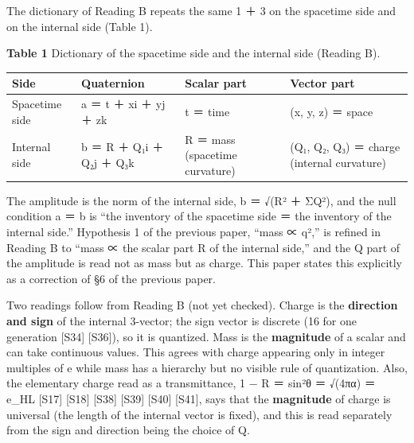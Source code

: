 \documentclass[
  a4paper,
]{article}
\newcounter{none} %
\begin{document}
The dictionary of Reading B repeats the same 1 ＋ 3 on the spacetime
side and on the internal side (Table 1).

\textbf{Table 1} Dictionary of the spacetime side and the internal side
(Reading B).

{\def\LTcaptype{none} %
\begin{longtable}[]{@{}
  >{\raggedright\arraybackslash}p{}
  >{\raggedright\arraybackslash}p{}
  >{\raggedright\arraybackslash}p{}
  >{\raggedright\arraybackslash}p{}@{}}
\toprule\noalign{}
\begin{minipage}[b]{\linewidth}\raggedright
Side
\end{minipage} & \begin{minipage}[b]{\linewidth}\raggedright
Quaternion
\end{minipage} & \begin{minipage}[b]{\linewidth}\raggedright
Scalar part
\end{minipage} & \begin{minipage}[b]{\linewidth}\raggedright
Vector part
\end{minipage} \\
\midrule\noalign{}
\endhead
\bottomrule\noalign{}
\endlastfoot
Spacetime side & a ＝ t ＋ xi ＋ yj ＋ zk & t ＝ time & (x, y, z) ＝
space \\
Internal side & b ＝ R ＋ Q₁i ＋ Q₂j ＋ Q₃k & R ＝ mass (spacetime
curvature) & (Q₁, Q₂, Q₃) ＝ charge (internal curvature) \\
\end{longtable}
}

The amplitude is the norm of the internal side, \textbar b\textbar{} ＝
√(R² ＋ ΣQ²), and the null condition \textbar a\textbar{} ＝
\textbar b\textbar{} is ``the inventory of the spacetime side ＝ the
inventory of the internal side.'' Hypothesis 1 of the previous paper,
``mass ∝ \textbar q\textbar²,'' is refined in Reading B to ``mass ∝ the
scalar part R of the internal side,'' and the Q part of the amplitude is
read not as mass but as charge. This paper states this explicitly as a
correction of §6 of the previous paper.

Two readings follow from Reading B (not yet checked). Charge is the
\textbf{direction and sign} of the internal 3-vector; the sign vector is
discrete (16 for one generation {[}S34{]} {[}S36{]}), so it is
quantized. Mass is the \textbf{magnitude} of a scalar and can take
continuous values. This agrees with charge appearing only in integer
multiples of e while mass has a hierarchy but no visible rule of
quantization. Also, the elementary charge read as a transmittance, 1 − R
＝ sin²θ ＝ √(4πα) ＝ e\_HL {[}S17{]} {[}S18{]} {[}S38{]} {[}S39{]}
{[}S40{]} {[}S41{]}, says that the \textbf{magnitude} of charge is
universal (the length of the internal vector is fixed), and this is read
separately from the sign and direction being the choice of Q.
\end{document}
